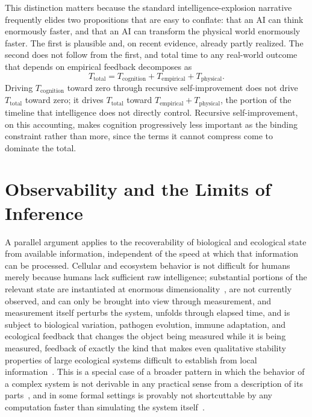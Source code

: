 \documentclass[11pt]{article}
\begin{document}
This distinction matters because the standard intelligence-explosion narrative frequently elides two propositions that are easy to conflate: that an AI can think enormously faster, and that an AI can transform the physical world enormously faster. The first is plausible and, on recent evidence, already partly realized. The second does not follow from the first, and total time to any real-world outcome that depends on empirical feedback decomposes as
\[
T_{\text{total}} = T_{\text{cognition}} + T_{\text{empirical}} + T_{\text{physical}}.
\]
Driving $T_{\text{cognition}}$ toward zero through recursive self-improvement does not drive $T_{\text{total}}$ toward zero; it drives $T_{\text{total}}$ toward $T_{\text{empirical}} + T_{\text{physical}}$, the portion of the timeline that intelligence does not directly control. Recursive self-improvement, on this accounting, makes cognition progressively less important as the binding constraint rather than more, since the terms it cannot compress come to dominate the total.

\section{Observability and the Limits of Inference}

A parallel argument applies to the recoverability of biological and ecological state from available information, independent of the speed at which that information can be processed. Cellular and ecosystem behavior is not difficult for humans merely because humans lack sufficient raw intelligence; substantial portions of the relevant state are instantiated at enormous dimensionality~\cite{kitano2002,noble2006,goldenfeldwoese2007}, are not currently observed, and can only be brought into view through measurement, and measurement itself perturbs the system, unfolds through elapsed time, and is subject to biological variation, pathogen evolution, immune adaptation, and ecological feedback that changes the object being measured while it is being measured, feedback of exactly the kind that makes even qualitative stability properties of large ecological systems difficult to establish from local information~\cite{may1972,levin1998}. This is a special case of a broader pattern in which the behavior of a complex system is not derivable in any practical sense from a description of its parts~\cite{anderson1972,simon1962,gellmann1994,mitchell2009}, and in some formal settings is provably not shortcuttable by any computation faster than simulating the system itself~\cite{wolfram1985,crutchfield2012}.
\end{document}
